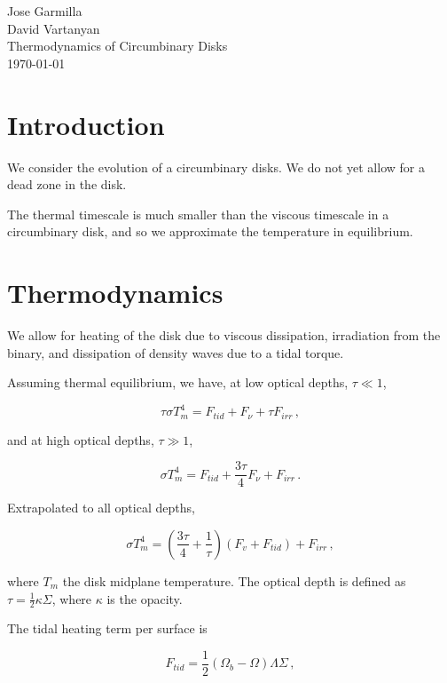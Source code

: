 \documentclass{article}
\begin{document}
\begin{flushleft}
Jose Garmilla \\
David Vartanyan\\
Thermodynamics of Circumbinary Disks\\
\today\\
\end{flushleft}
\section{Introduction}
We consider the evolution of a circumbinary disks. We do not yet allow for a dead zone in the disk.

The thermal timescale is much smaller than the viscous timescale in a circumbinary disk, and so we approximate the temperature in equilibrium.

\section{Thermodynamics}
We allow for heating of the disk due to viscous dissipation, irradiation from the binary, and dissipation of density waves due to a tidal torque.

Assuming thermal equilibrium, we have, at low optical depths, $\tau \ll 1$,

\begin{equation}
\tau \sigma T_m^4 = F_{tid} + F_{\nu} + \tau F_{irr}\,,
\end{equation}

and at high optical depths, $\tau \gg 1$,

\begin{equation}
\sigma T_m^4 = F_{tid} + \frac{3\tau}{4}  F_\nu + F_{irr}\,.
\end{equation}

Extrapolated to all optical depths,

\begin{equation} \label{eq:encon}
\sigma T_m^4= \left(\frac{3\tau}{4} + \frac{1}{\tau}\right) \left(F_{v} + F_{tid}\right) + F_{irr}\,,
\end{equation}

where $T_m$ the disk midplane temperature. The optical depth is defined as $\tau =\frac{1}{2} \kappa \Sigma$, where $\kappa$ is the opacity.

The tidal heating term per surface is

\begin{equation}
F_{tid} = \frac{1}{2}\left(\Omega_b - \Omega\right) \Lambda \Sigma\,,
\end{equation}
\end{document}
